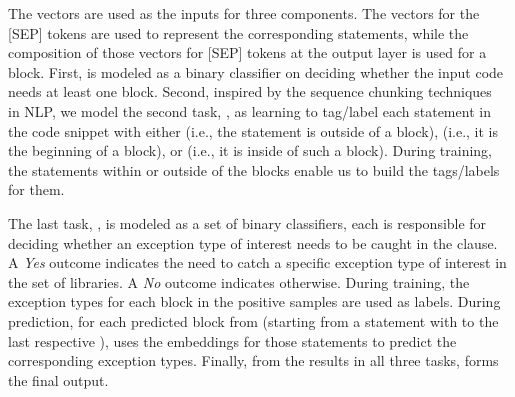 The vectors are used as the inputs for three components. The vectors
for the [SEP] tokens are used to represent the corresponding
statements, while the composition of those vectors for [SEP] tokens at
the output layer is used for a block.
%
First, {\xblock} is modeled as a binary classifier on deciding whether
the input code needs at least one  block. Second,
inspired by the sequence chunking
techniques~\cite{sequence-chunking-aaai17} in NLP, we model the second
task, {\xstate}, as learning to tag/label each statement in the code
snippet with either  (i.e., the statement is outside of a
 block),  (i.e., it is the beginning of a
 block), or  (i.e., it is inside of such a
block).
During training, the statements within or outside of the
 blocks enable us to build the tags/labels for them.

The last task, {\xtype}, is modeled as a set of binary classifiers,
each is responsible for deciding whether an exception type of interest
needs to be caught in the  clause. A {\em Yes} outcome
indicates the need to catch a specific exception type of interest in
the set of libraries. A {\em No} outcome indicates otherwise.  During
training, the exception types for each  block in the
positive samples are used as labels. During prediction, for each
predicted block from {\xstate} (starting from a statement with
 to the last respective ), {\xtype} uses the
embeddings for those statements to predict the corresponding exception
types. Finally, from the results in all three tasks, {\tool} forms the
final output.


